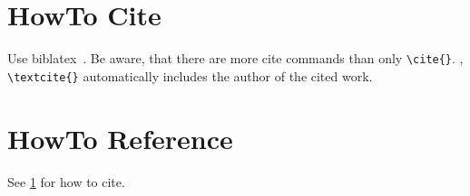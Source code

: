 \documentclass{scrartcl}
\begin{document}
\section{HowTo Cite}
\label{begin}
Use biblatex~\cite{stackexchange}.
Be aware, that there are more cite commands than only \texttt{\textbackslash{}cite\{\}}.
\textcite{stackexchange}, \texttt{\textbackslash{}textcite\{\}} automatically includes the author of the cited work.
\section{HowTo Reference}
See \cref{begin} for how to cite.
\printbibliography{}
\end{document}
